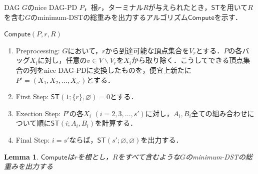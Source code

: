 \documentclass[master]{kuisthesis}		%
\theoremstyle{plain}
\newtheorem{lemma}{Lemma}
\theoremstyle{definition}
\begin{document}
    



DAG $G$のnice DAG-PD $P$，根$r$，ターミナル$R$が与えられたとき，$\mathsf{ST}$を用いて$R$を含む$G$のminimum-DSTの総重みを出力するアルゴリズム$\mathsf{Compute}$を示す．


$\mathsf{Compute}(P, r, R)$


\begin{enumerate}
    \item Preprocessing: $G$において，$r$から到達可能な頂点集合を$V_r$とする．$P$の各バッグ$X_i$に対し，任意の$v \in V \backslash V_r$を$X_i$から取り除く．こうしてできる頂点集合の列をnice DAG-PDに変換したものを，便宜上新たに$P' = (X_1, X_2, \dots , X_{s'})$とする．
    \item First Step: $\mathsf{ST}(1; \{r\}, \varnothing) = 0$とする．
    \item Exection Step: $P'$の各$X_i$ $(i=2, 3, \dots, s')$に対し，$A_i, B_i$全ての組み合わせについて順に$\mathsf{ST}(i; A_i, B_i)$を計算する．
    \item Final Step: $i = s'$ならば，$\mathsf{ST}(s'; \varnothing, \varnothing)$を出力する．
\end{enumerate}


\begin{lemma}\label{dst}
    $\mathsf{Compute}$は$r$を根とし，$R$をすべて含むような$G$のminimum-DSTの総重みを出力する
\end{lemma}
\end{document}
